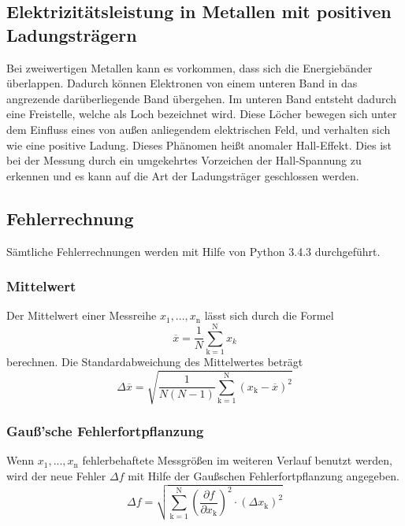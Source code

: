 \subsection{Elektrizitätsleistung in Metallen mit positiven Ladungsträgern}
Bei zweiwertigen Metallen kann es vorkommen, dass sich die Energiebänder überlappen. Dadurch können Elektronen von einem unteren Band in das angrezende darüberliegende Band übergehen. Im unteren Band entsteht dadurch eine Freistelle, welche als Loch bezeichnet wird. Diese Löcher bewegen sich unter dem Einfluss eines von außen anliegendem elektrischen Feld, und verhalten sich wie eine positive Ladung. Dieses Phänomen heißt anomaler Hall-Effekt. Dies ist bei der Messung durch ein umgekehrtes Vorzeichen der Hall-Spannung zu erkennen und es kann auf die Art der Ladungsträger geschlossen werden.






\subsection{Fehlerrechnung}
Sämtliche Fehlerrechnungen werden mit Hilfe von Python 3.4.3 durchgeführt.
\subsubsection{Mittelwert}
Der Mittelwert einer Messreihe $x_\text{1}, ... ,x_\text{n}$ lässt sich durch die Formel
\begin{equation}
	\overline{x} = \frac{1}{N} \sum_{\text{k}=1}^\text{N} x_k
	\label{eqn:ave}
\end{equation}
berechnen. Die Standardabweichung des Mittelwertes beträgt
\begin{equation}
	\Delta \overline{x} = \sqrt{ \frac{1}{N(N-1)} \sum_{\text{k}=1}^\text{N} (x_\text{k} - \overline{x})^2}
	\label{eqn:std}
\end{equation}

\subsubsection{Gauß'sche Fehlerfortpflanzung}
Wenn $x_\text{1}, ..., x_\text{n}$ fehlerbehaftete Messgrößen im weiteren Verlauf benutzt werden, wird der neue Fehler $\Delta f$ mit Hilfe der Gaußschen Fehlerfortpflanzung angegeben.
\begin{equation}
	\Delta f = \sqrt{\sum_{\text{k}=1}^\text{N} \left( \frac{ \partial f}{\partial x_\text{k}} \right) ^2 \cdot (\Delta x_\text{k})^2}
	\label{eqn:var}
\end{equation}

